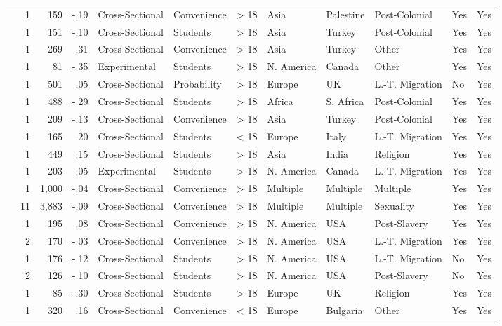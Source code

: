 \documentclass[10pt, letterpaper]{article}
\begin{document}
\begin{landscape}
\begin{xltabular}{650pt}{Xrrrllrlllll}
  \cite{3201} & 1 & 159 & -.19 & Cross-Sectional & Convenience & > 18 & Asia & Palestine & Post-Colonial & Yes & Yes\\
\cite{322} & 1 & 151 & -.10 & Cross-Sectional & Students & > 18 & Asia & Turkey & Post-Colonial & Yes & Yes\\
\cite{414} & 1 & 269 & .31 & Cross-Sectional & Convenience & > 18 & Asia & Turkey & Other & Yes & Yes\\
\cite{2075} & 1 & 81 & -.35 & Experimental & Students & > 18 & N. America & Canada & Other & Yes & Yes\\
\cite{2397} & 1 & 501 & .05 & Cross-Sectional & Probability & > 18 & Europe & UK & L.-T. Migration & No & Yes\\
\cite{284} & 1 & 488 & -.29 & Cross-Sectional & Students & > 18 & Africa & S. Africa & Post-Colonial & Yes & Yes\\
\cite{1248} & 1 & 209 & -.13 & Cross-Sectional & Convenience & > 18 & Asia & Turkey & Post-Colonial & Yes & Yes\\
\cite{3196} & 1 & 165 & .20 & Cross-Sectional & Students & < 18 & Europe & Italy & L.-T. Migration & Yes & Yes\\
\cite{93} & 1 & 449 & .15 & Cross-Sectional & Students & > 18 & Asia & India & Religion & Yes & Yes\\
\cite{2033} & 1 & 203 & .05 & Experimental & Students & > 18 & N. America & Canada & L.-T. Migration & Yes & Yes\\
\cite{3054} & 1 & 1,000 & -.04 & Cross-Sectional & Convenience & > 18 & Multiple & Multiple & Multiple & Yes & Yes\\
 & 11 & 3,883 & -.09 & Cross-Sectional & Convenience & > 18 & Multiple & Multiple & Sexuality & Yes & Yes\\
\cite{2309} & 1 & 195 & .08 & Cross-Sectional & Convenience & > 18 & N. America & USA & Post-Slavery & Yes & Yes\\
 & 2 & 170 & -.03 & Cross-Sectional & Convenience & > 18 & N. America & USA & L.-T. Migration & Yes & Yes\\
\cite{894} & 1 & 176 & -.12 & Cross-Sectional & Students & > 18 & N. America & USA & L.-T. Migration & No & Yes\\
 & 2 & 126 & -.10 & Cross-Sectional & Students & > 18 & N. America & USA & Post-Slavery & No & Yes\\
\cite{1376} & 1 & 85 & -.30 & Cross-Sectional & Students & > 18 & Europe & UK & Religion & Yes & Yes\\
\cite{4004} & 1 & 320 & .16 & Cross-Sectional & Convenience & < 18 & Europe & Bulgaria & Other & Yes & Yes\\

\end{xltabular}
\end{landscape}
\end{document}
